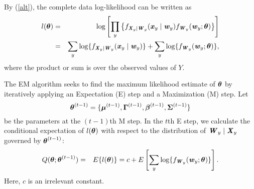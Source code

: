 \documentclass[12pt]{article}
\def \bfitw{\mbox{\textbf{\textit{w}}}}
\def \bfitx{\mbox{\textbf{\textit{x}}}}
\def \bfitz{\mbox{\textbf{\textit{z}}}}
\def \bfitW{\mbox{\textbf{\textit{W}}}}
\def \sbfitW{\mbox{\scriptsize\textbf{\textit{W}}}}
\def \bfitX{\mbox{\textbf{\textit{X}}}}
\def \sbfitX{\mbox{\scriptsize\textbf{\textit{X}}}}
\def \bfbeta{\mbox{\boldmath $\beta$}}
\def \bfmu{\mbox{\boldmath $\mu$}}
\def \bftheta{\mbox{\boldmath $\theta$}}
\def \bfGamma{\mbox{\boldmath $\Gamma$}}
\def \bfSigma{\mbox{\boldmath $\Sigma$}}
\begin{document}
By (\ref{alt}), the complete data log-likelihood can be written as
\begin{eqnarray}
\nonumber
l(\bftheta)
&=& \log\left[\prod_{y} \left\{f_{\sbfitX_y \mid \sbfitW_y}(\bfitx_y \mid \bfitw_y) f_{\sbfitW_y}(\bfitw_y; \bftheta)\right\}\right] \\
&=& \sum_{y} \log\{f_{\sbfitX_y \mid \sbfitW_y}(\bfitx_y \mid \bfitw_y)\} + \sum_{y} \log\{f_{\sbfitW_y}(\bfitw_y; \bftheta)\},
\end{eqnarray}
where the product or sum is over the observed values of $Y$.

The EM algorithm seeks to find the maximum likelihood estimate of $\bftheta$ by iteratively applying an Expectation (E) step and a Maximization (M) step. Let
$$\bftheta^{(t - 1)} = \{\bfmu^{(t - 1)}, \bfGamma^{(t - 1)}, \bfbeta^{(t - 1)}, \bfSigma^{(t - 1)}\}$$
be the parameters at the $(t - 1)$th M step. In the $t$th E step, we calculate the conditional expectation of $l(\bftheta)$ with respect to the distribution of $\bfitW_y \mid \bfitX_y$ governed by $\bftheta^{(t - 1)}$:
\begin{eqnarray}
\nonumber
Q(\bftheta; \bftheta^{(t - 1)}) &=& E\{l(\bftheta)\} = c + E\left[\sum_{y} \log\{f_{\sbfitW_y}(\bfitw_y; \bftheta)\}\right].
\end{eqnarray}
Here, $c$ is an irrelevant constant.
\end{document}

